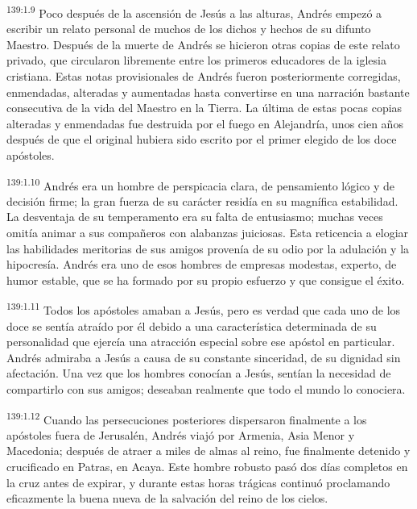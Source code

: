 \par
\textsuperscript{139:1.9} Poco después de la ascensión de Jesús a las alturas, Andrés empezó a escribir un relato personal de muchos de los dichos y hechos de su difunto Maestro. Después de la muerte de Andrés se hicieron otras copias de este relato privado, que circularon libremente entre los primeros educadores de la iglesia cristiana. Estas notas provisionales de Andrés fueron posteriormente corregidas, enmendadas, alteradas y aumentadas hasta convertirse en una narración bastante consecutiva de la vida del Maestro en la Tierra. La última de estas pocas copias alteradas y enmendadas fue destruida por el fuego en Alejandría, unos cien años después de que el original hubiera sido escrito por el primer elegido de los doce apóstoles.

\par
\textsuperscript{139:1.10} Andrés era un hombre de perspicacia clara, de pensamiento lógico y de decisión firme; la gran fuerza de su carácter residía en su magnífica estabilidad. La desventaja de su temperamento era su falta de entusiasmo; muchas veces omitía animar a sus compañeros con alabanzas juiciosas. Esta reticencia a elogiar las habilidades meritorias de sus amigos provenía de su odio por la adulación y la hipocresía. Andrés era uno de esos hombres de empresas modestas, experto, de humor estable, que se ha formado por su propio esfuerzo y que consigue el éxito.

\par
\textsuperscript{139:1.11} Todos los apóstoles amaban a Jesús, pero es verdad que cada uno de los doce se sentía atraído por él debido a una característica determinada de su personalidad que ejercía una atracción especial sobre ese apóstol en particular. Andrés admiraba a Jesús a causa de su constante sinceridad, de su dignidad sin afectación. Una vez que los hombres conocían a Jesús, sentían la necesidad de compartirlo con sus amigos; deseaban realmente que todo el mundo lo conociera.

\par
\textsuperscript{139:1.12} Cuando las persecuciones posteriores dispersaron finalmente a los apóstoles fuera de Jerusalén, Andrés viajó por Armenia, Asia Menor y Macedonia; después de atraer a miles de almas al reino, fue finalmente detenido y crucificado en Patras, en Acaya. Este hombre robusto pasó dos días completos en la cruz antes de expirar, y durante estas horas trágicas continuó proclamando eficazmente la buena nueva de la salvación del reino de los cielos.

